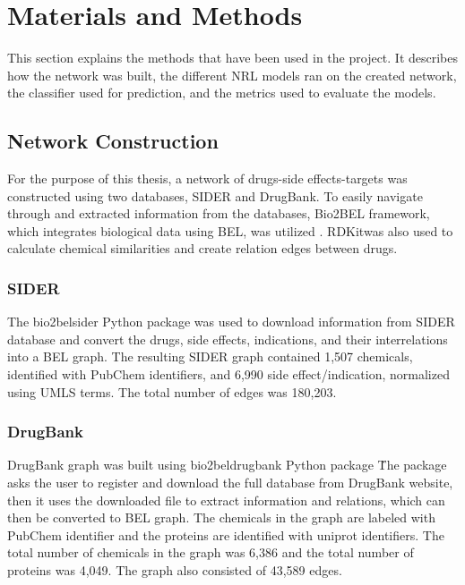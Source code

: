 \chapter{Materials and Methods}
\label{methods}

This section explains the methods that have been used in the project.
It describes how the network was built, the different \ac{NRL} models ran on the created network, the classifier used for prediction, and the metrics used to evaluate the models.

\section{Network Construction}

For the purpose of this thesis, a network of drugs-side effects-targets was constructed using two databases, \ac{SIDER} and DrugBank.
To easily navigate through and extracted information from the databases, Bio2BEL framework, which integrates biological data using \ac{BEL}, was utilized \cite{hoyt_integration_2019}.
RDKit\footnotemark was also used to calculate chemical similarities and create relation edges between drugs.

\subsection{SIDER}
The bio2bel\textunderscore sider Python package \cite{charles_tapley_hoyt_bio2bel/sider_2018} was used to download information from \ac{SIDER} database and convert the drugs, side effects, indications, and their interrelations into a \ac{BEL} graph.
The resulting \ac{SIDER} graph contained 1,507 chemicals, identified with PubChem identifiers, and 6,990 side effect/indication, normalized using \ac{UMLS} terms.
The total number of edges was 180,203.

\subsection{DrugBank}

DrugBank graph was built using bio2bel\textunderscore drugbank Python package \cite{charles_tapley_hoyt_bio2bel/drugbank_2018}\.The package asks the user to register and download the full database from DrugBank website, then it uses the downloaded file to extract information and relations, which can then be converted to \ac{BEL} graph.
The chemicals in the graph are labeled with PubChem identifier and the proteins are identified with uniprot identifiers.
The total number of chemicals in the graph was 6,386 and the total number of proteins was 4,049.
The graph also consisted of 43,589 edges.

